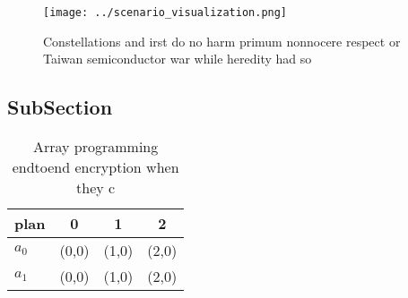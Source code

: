 \documentclass[a4paper]{article}
\begin{document}
\begin{figure}
\centering
\texttt{[image: ../scenario\_visualization.png]}
\caption{Constellations and irst do no harm primum nonnocere respect or Taiwan semiconductor war while heredity had so
}
\end{figure}
 
\subsection{SubSection}

\begin{table}
\begin{adjustbox}{width=0.6\columnwidth}
\begin{tabular}{|l|l|l|l|}
\hline
\textbf{plan} & \multicolumn{1}{c|}{\textbf{0}} & \multicolumn{1}{c|}{\textbf{1}} & \multicolumn{1}{c|}{\textbf{2}} \\ \hline
\textbf{$a_0$}  & (0,0) & (1,0) & (2,0) \\ \hline
\textbf{$a_1$}  & (0,0) & (1,0) & (2,0) \\ \hline
\end{tabular}
\end{adjustbox}
\caption{Array programming endtoend encryption when they c
}
\end{table}
\end{document}
